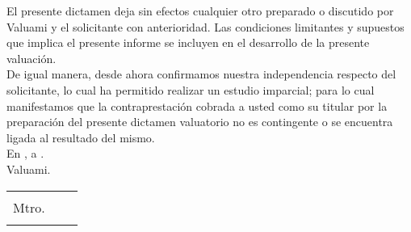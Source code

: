 El presente dictamen deja sin efectos cualquier otro preparado o discutido por \textcolor{principal}{Valuami} y el solicitante con anterioridad. Las condiciones limitantes y supuestos que implica el presente informe se incluyen en el desarrollo de la presente valuación.\\

De igual manera, desde ahora confirmamos nuestra independencia respecto del solicitante, lo cual ha permitido realizar un estudio imparcial; para lo cual manifestamos que la contraprestación cobrada a usted como su titular por la preparación del presente dictamen valuatorio no es contingente o se encuentra ligada al resultado del mismo.\\


\textcolor{principal}{En \lugarInforme, a \fechaInforme.}\\

\textcolor{principal}{Valuami.}\\

\begin{table}[H]
\centering
	\begin{tabular}{cm{1cm}c}
	\begin{minipage}{7cm}
	\begin{center}
		
		
		\rule{7cm}{.4pt}\\
		Mtro. \nombrePerito\\
		\textcolor{principal}{\descripcionFirmaPerito}
		
		
	\end{center}
	\end{minipage}&&
%		
%		
	
	\end{tabular}
\end{table}


